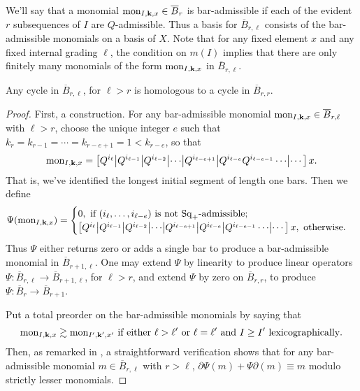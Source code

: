 \documentclass[11pt]{article}
\renewcommand{\Q}{Q}
\newcommand{\SqShift}{\Sq_{+}}
\newcommand{\Sq}{\mathrm{Sq}}
\newcommand{\minDim}{m}
\newcommand{\BarMonomial}[3]{\textup{mon}_{#1,#2,#3}}
\begin{document}
\begin{KoszulComplexes2plus}
\begin{prop*}
\end{prop*}
\noindent We'll say that a monomial $\BarMonomial{I}{\textbf{k}}{x}\in\overline{B}_r$ is bar-admissible if each of the evident $r$ subsequences of $I$ are $\Q$-admissible. Thus a basis for $\overline{B}_{r,\ell}$ consists of the bar-admissible monomials on a basis of $X$. Note that for any fixed element $x$ and any fixed internal grading $\ell$, the condition on $\minDim(I)$ implies that there are only finitely many monomials of the form $\BarMonomial{I}{\textbf{k}}{x}$ in $\overline{B}_{r,\ell}$.
\begin{prop*}
Any cycle in $\overline{B}_{r,\ell}$, for $\ell>r$ is homologous to a cycle in $\overline{B}_{r,r}$.
\end{prop*}
\begin{proof}
First, a construction. For any bar-admissible monomial $\BarMonomial{I}{\textbf{k}}{x}\in\overline{B}_{r,\ell}$ with $\ell>r$, choose the unique integer $e$ such that $k_r=k_{r-1}=\cdots =k_{r-e+1}=1<k_{r-e}$, so that
\[\BarMonomial{I}{\textbf{k}}{x}=\left[\Q^{i_\ell}\middle|\Q^{i_{\ell-1}} \middle|\Q^{i_{\ell-2}}\middle|\cdots \middle|\Q^{i_{\ell-e+1}}\middle|\Q^{i_{\ell-e}}\Q^{i_{\ell-e-1}}\cdots \middle|\cdots \right]x.\]
That is, we've identified the longest initial segment of length one bars. Then we define
\[\Psi(\BarMonomial{I}{\textbf{k}}{x})=\begin{cases}
0,\textup{ if }(i_{\ell},\ldots,i_{\ell-e})\textup{ is not $\SqShift$-admissible};\\
\left[\Q^{i_\ell}\middle|\Q^{i_{\ell-1}} \middle|\Q^{i_{\ell-2}}\middle|\cdots \middle|\Q^{i_{\ell-e+1}}\middle|\Q^{i_{\ell-e}}\middle|\Q^{i_{\ell-e-1}}\cdots \middle|\cdots \right]x,\textup{ otherwise}.
\end{cases}
\]
Thus $\Psi$ either returns zero or adds a single bar to produce a bar-admissible monomial in $\overline{B}_{r+1,\ell}$. One may extend $\Psi$ by linearity to produce linear operators $\Psi:\overline{B}_{r,\ell}\to\overline{B}_{r+1,\ell}$, for $\ell>r$, and extend $\Psi$ by zero on $\overline{B}_{r,r}$, to produce $\Psi:\overline{B}_{r}\to\overline{B}_{r+1}$.


Put a total preorder on the bar-admissible monomials by saying that
\[\BarMonomial{I}{\textbf{k}}{x}\gtrsim \BarMonomial{I'}{\textbf{k}'}{x'}\textup{ if either } \ell>\ell'\textup{ or }\ell=\ell'\textup{ and }I\geq I'\textup{ lexicographically}.\]
Then, as remarked in \cite[proof of thm 5.3]{PriddyKoszul.pdf}, a straightforward verification shows that for any bar-admissible monomial $m\in\overline{B}_{r,\ell}$ with $r>\ell$, $\partial\Psi(m)+\Psi\partial(m)\equiv m$ modulo strictly lesser monomials.


\end{proof}
\end{KoszulComplexes2plus}
\end{document}
